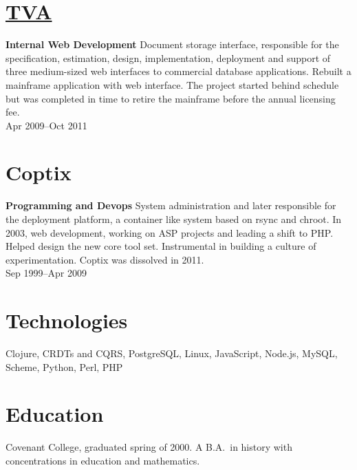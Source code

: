 \documentclass[margin]{res}
\begin{document}
\begin{resume}
\section{\href{http://tva.gov/}{TVA}}
{\bf Internal Web Development}
%
Document storage interface, responsible for the specification,
estimation, design, implementation, deployment and support of three
medium-sized web interfaces to commercial database applications.
Rebuilt a mainframe application with web interface. The project
started behind schedule but was completed in time to retire the
mainframe before the annual licensing fee.\\
%
Apr 2009--Oct 2011

\section{Coptix}
{\bf Programming and Devops}
%
System administration and later responsible for the deployment
platform, a container like system based on rsync and chroot. In 2003,
web development, working on ASP projects and leading a shift to PHP.
Helped design the new core tool set. Instrumental in building a
culture of experimentation. Coptix was dissolved in 2011.\\
%
Sep 1999--Apr 2009

\section{Technologies}

Clojure, CRDTs and CQRS, PostgreSQL, Linux, JavaScript, Node.js,
MySQL, Scheme, Python, Perl, PHP

\section{Education}

Covenant College, graduated spring of 2000. A B.A.\ in history with
concentrations in education and mathematics.

\end{resume}
\end{document}
